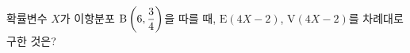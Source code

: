 확률변수 $X$가 이항분포 $\mathrm{B}\left(6{,}\mkern3mu\mathopen{}\dfrac{3}{4}\right)$을 따를 때, $\mathrm{E}(4X-2)$, $\mathrm{V}(4X-2)$를 차례대로 구한 것은?

